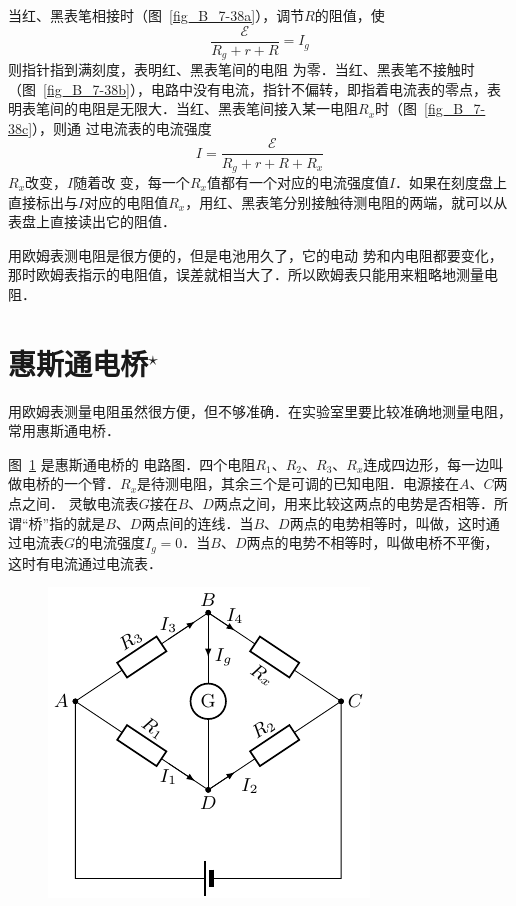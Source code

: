 当红、黑表笔相接时（图~\ref{fig_B_7-38a}），调节$R$的阻值，使
\[\frac{\mathcal{E}}{R_g+r+R}=I_g\]
则指针指到满刻度，表明红、黑表笔间的电阻
为零．当红、黑表笔不接触时（图~\ref{fig_B_7-38b}），电路中没有电流，指针不偏转，即指着电流表的零点，表明表笔间的电阻是无限大．当红、黑表笔间接入某一电阻$R_x$时（图~\ref{fig_B_7-38c}），则通
过电流表的电流强度
\[I=\frac{\mathcal{E}}{R_g+r+R+R_x}\]
$R_x$改变，$I$随着改
变，每一个$R_x$值都有一个对应的电流强度值$I$．如果在刻度盘上直接标出与$I$对应的电阻值$R_x$，用红、黑表笔分别接触待测电阻的两端，就可以从表盘上直接读出它的阻值．

用欧姆表测电阻是很方便的，但是电池用久了，它的电动
势和内电阻都要变化，那时欧姆表指示的电阻值，误差就相当大了．所以欧姆表只能用来粗略地测量电阻．



\section{惠斯通电桥$^\star$}
用欧姆表测量电阻虽然很方便，但不够准确．在实验室里要比较准确地测量电阻，常用惠斯通电桥．


图~\ref{fig_B_7-39} 是惠斯通电桥的
电路图．四个电阻$R_1$、$R_2$、$R_3$、$R_x$连成四边形，每一边叫做电桥的一个臂．$R_x$是待测电阻，其余三个是可调的已知电阻．电源接在$A$、$C$两点之间．
灵敏电流表$G$接在$B$、$D$两点之间，用来比较这两点的电势是否相等．所谓“桥”指的就是$B$、$D$两点间的连线．当$B$、$D$两点的电势相等时，叫做，这时通过电流表$G$的电流强度$I_g=0$．当$B$、$D$两点的电势不相等时，叫做电桥不平衡，这时有电流通过电流表．

\begin{figure}[htbp]
	\centering
	\includegraphics{fig/B/7-39.pdf}
	\caption{}\label{fig_B_7-39}
\end{figure}

